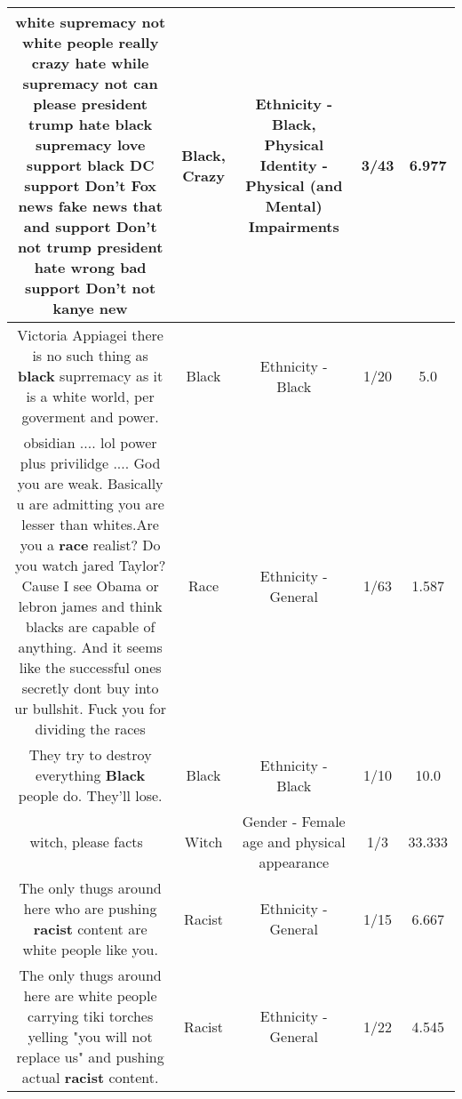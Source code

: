 \documentclass[11pt]{article}
\newlength\mylength
\begin{document}
\begin{center}
\begin{longtable}{|C{.65\mylength}|C{.30\mylength}|C{.12\mylength}|C{.12\mylength}|C{.12\mylength}|}
  \small white supremacy not  white people really \textbf{crazy} hate while supremacy not can please president trump hate    \textbf{black} supremacy love support \textbf{black} DC  support Don't Fox news fake news that and support Don't not trump president hate wrong bad  support Don't not   kanye new\normalsize   & Black, Crazy & Ethnicity - Black, Physical Identity - Physical (and Mental) Impairments & 3/43 & 6.977 \\  \hline
  \small Victoria Appiagei there is no such thing as \textbf{black} suprremacy as it is a white world, per goverment and power.\normalsize   & Black & Ethnicity - Black & 1/20 & 5.0 \\  \hline
  \small obsidian .... lol power plus privilidge  ....  God you are weak.   Basically u are admitting you are lesser than whites.Are you a \textbf{race} realist?  Do you watch jared Taylor?    Cause I see Obama or lebron james and think blacks are capable of anything.   And it seems like the successful ones secretly dont buy into ur bullshit.  Fuck you for dividing the races\normalsize   & Race & Ethnicity - General & 1/63 & 1.587 \\  \hline
  \small They try to destroy everything \textbf{Black} people do. They'll lose.\normalsize   & Black & Ethnicity - Black & 1/10 & 10.0 \\  \hline
  \small witch, please facts👌🏽\normalsize   & Witch & Gender - Female age and physical appearance & 1/3 & 33.333 \\  \hline
  \small The only thugs around here who are pushing \textbf{racist} content are white people like you.\normalsize   & Racist & Ethnicity - General & 1/15 & 6.667 \\  \hline
  \small The only thugs around here are white people carrying tiki torches yelling "you will not replace us" and pushing actual \textbf{racist} content.\normalsize   & Racist & Ethnicity - General & 1/22 & 4.545 \\  \hline

\end{longtable}
\end{center}
\end{document}
